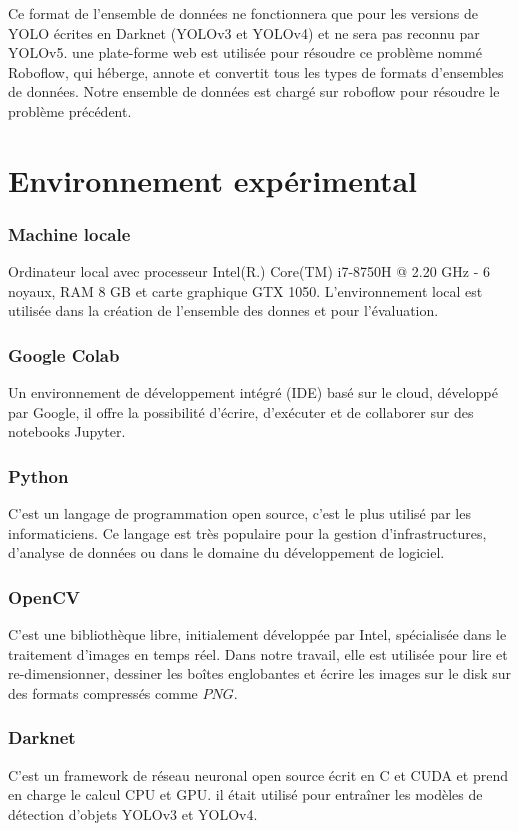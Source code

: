           Ce format de l'ensemble de données ne fonctionnera que pour les versions de YOLO écrites en Darknet (YOLOv3 et YOLOv4) et ne sera pas reconnu par YOLOv5. une plate-forme web est utilisée pour résoudre ce problème nommé Roboflow, qui héberge, annote et convertit tous les types de formats d'ensembles de données. Notre ensemble de données est chargé sur roboflow pour résoudre le problème précédent.
              
          

\section{Environnement expérimental}
     \subsubsection{Machine locale}Ordinateur local avec processeur Intel(R.) Core(TM) i7-8750H @ 2.20 GHz - 6 noyaux, RAM 8 GB et carte graphique GTX 1050. L'environnement local est utilisée dans la création de l'ensemble des donnes et pour l'évaluation.
     
     \subsubsection{Google Colab} Un environnement de développement intégré (IDE) basé sur le cloud, développé par Google, il offre la possibilité d’écrire, d’exécuter et de collaborer sur des notebooks Jupyter.
     
      \subsubsection{Python} C'est un langage de programmation open source, c'est le plus utilisé par les informaticiens. Ce langage est très populaire pour la gestion d'infrastructures, d'analyse de données ou dans le domaine du développement de logiciel.
      
     \subsubsection{OpenCV} C'est une bibliothèque libre, initialement développée par Intel, spécialisée dans le traitement d'images en temps réel. Dans notre travail, elle est utilisée pour lire et re-dimensionner, dessiner les boîtes englobantes et écrire les images sur le disk sur des formats compressés comme $PNG$.
     \subsubsection{Darknet} C'est un framework de réseau neuronal open source écrit en C et CUDA et prend en charge le calcul CPU et GPU. il était utilisé pour entraîner les modèles de détection d'objets YOLOv3 et YOLOv4.
